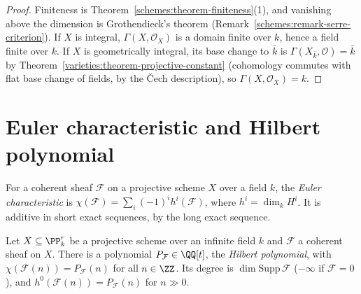 \begin{proof}
Finiteness is Theorem~\ref{schemes:theorem-finiteness}(1), and vanishing above the dimension is Grothendieck's theorem
(Remark~\ref{schemes:remark-serre-criterion}). If $X$ is integral, $\Gamma(X, \mathcal{O}_X)$ is a domain finite over $k$, hence a field finite over $k$. If $X$
is geometrically integral, its base change to $\bar k$ is $\Gamma(X_{\bar k}, \mathcal{O}) = \bar k$ by Theorem~\ref{varieties:theorem-projective-constant}
(cohomology commutes with flat base change of fields, by the \v{C}ech description), so $\Gamma(X, \mathcal{O}_X) = k$.
\end{proof}

\section{Euler characteristic and Hilbert polynomial}\label{schemes:section-hilbert}

\begin{definition}\label{schemes:definition-euler}
For a coherent sheaf $\mathcal{F}$ on a projective scheme $X$ over a field $k$, the \emph{Euler characteristic} is $\chi(\mathcal{F}) = \sum_i(-1)^ih^i(\mathcal{F})$, where
$h^i = \dim_kH^i$. It is additive in short exact sequences, by the long exact sequence.
\end{definition}

\begin{theorem}\label{schemes:theorem-hilbert-polynomial}
Let $X \subseteq \PP^r_k$ be a projective scheme over an infinite field $k$ and $\mathcal{F}$ a coherent sheaf on $X$. There is a polynomial $P_\mathcal{F} \in \QQ[t]$, the
\emph{Hilbert polynomial}, with $\chi(\mathcal{F}(n)) = P_\mathcal{F}(n)$ for all $n \in \ZZ$. Its degree is $\dim\mathrm{Supp}\,\mathcal{F}$ ($-\infty$ if $\mathcal{F} = 0$), and
$h^0(\mathcal{F}(n)) = P_\mathcal{F}(n)$ for $n \gg 0$.
\end{theorem}

